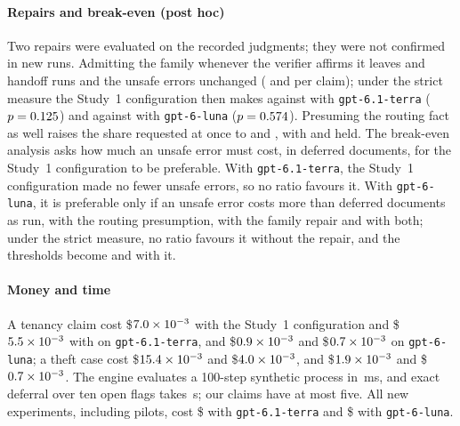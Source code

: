 \paragraph{Repairs and break-even (post hoc)}
Two repairs were evaluated on the recorded judgments; they were not confirmed in new runs. Admitting the family whenever the verifier affirms it leaves \repTerraHandoffRuns{} and \repLunaHandoffRuns{} handoff runs and the unsafe errors unchanged (\repTerraUnsafe{} and \repLunaUnsafe{} per claim); under the strict measure the Study~1 configuration then makes \repTerraUnsafeStrict{} against \repTerraCtUnsafeStrictB{} with \texttt{gpt-6.1-terra} ($p=0.125$) and \repLunaUnsafeStrict{} against \repLunaCtUnsafeStrictB{} with \texttt{gpt-6-luna} ($p=0.574$). Presuming the routing fact as well raises the share requested at once to \pct{\repPresTerraRecall} and \pct{\repPresLunaRecall}, with \pct{\repPresTerraHeld} and \pct{\repPresLunaHeld} held. The break-even analysis asks how much an unsafe error must cost, in deferred documents, for the Study~1 configuration to be preferable. With \texttt{gpt-6.1-terra}, the Study~1 configuration made no fewer unsafe errors, so no ratio favours it. With \texttt{gpt-6-luna}, it is preferable only if an unsafe error costs more than \beLunaCPxRatio{} deferred documents as run, \beLunaCPrRatio{} with the routing presumption, \repLunaRatio{} with the family repair and \repPresLunaRatio{} with both; under the strict measure, no ratio favours it without the repair, and the thresholds become \repLunaRatioStrict{} and \repPresLunaRatioStrict{} with it.

\paragraph{Money and time}
A tenancy claim cost \$$7.0\times10^{-3}$ with the Study~1 configuration and \$$5.5\times10^{-3}$ with  on \texttt{gpt-6.1-terra}, and \$$0.9\times10^{-3}$ and \$$0.7\times10^{-3}$ on \texttt{gpt-6-luna}; a theft case cost \$$15.4\times10^{-3}$ and \$$4.0\times10^{-3}$, and \$$1.9\times10^{-3}$ and \$$0.7\times10^{-3}$. The engine evaluates a 100-step synthetic process in \scaleHundredMs{}\,ms, and exact deferral over ten open flags takes \scaleExactTen{}\,s; our claims have at most five. All new experiments, including pilots, cost \$\spendTerra{} with \texttt{gpt-6.1-terra} and \$\spendLuna{} with \texttt{gpt-6-luna}.

